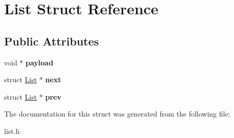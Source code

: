 \hypertarget{struct_list}{\section{List Struct Reference}
\label{struct_list}
}
\subsection*{Public Attributes}
\begin{DoxyCompactItemize}
\item 
\hypertarget{struct_list_afdba5d111f97e5dfdb051d2a1344cbee}{void $\ast$ {\bfseries payload}}\label{struct_list_afdba5d111f97e5dfdb051d2a1344cbee}

\item 
\hypertarget{struct_list_aa395a364263b11a52818d9ab2d1ad768}{struct \hyperlink{struct_list}{List} $\ast$ {\bfseries next}}\label{struct_list_aa395a364263b11a52818d9ab2d1ad768}

\item 
\hypertarget{struct_list_a36b6bf16a1c800f4a9877d1190039842}{struct \hyperlink{struct_list}{List} $\ast$ {\bfseries prev}}\label{struct_list_a36b6bf16a1c800f4a9877d1190039842}

\end{DoxyCompactItemize}


The documentation for this struct was generated from the following file\-:\begin{DoxyCompactItemize}
\item 
list.\-h\end{DoxyCompactItemize}
